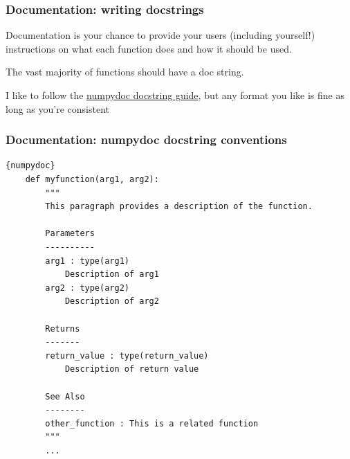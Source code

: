 \documentclass[10pt]{beamer}
\begin{document}
  \begin{frame} \frametitle{Documentation: writing docstrings}

    Documentation is your chance to provide your users (including yourself!) instructions
    on what each function does and how it should be used.

    \vspace{0.25cm}

    The vast majority of functions should have a doc string.

    \vspace{0.25cm}

    I like to follow the
    \href{https://numpydoc.readthedocs.io/en/latest/format.html}{numpydoc docstring guide},
    but any format you like is fine as long as you're consistent

  \end{frame}

  \begin{frame}[fragile] \frametitle{Documentation: numpydoc docstring conventions}

    \begin{lstlisting}{numpydoc}
    def myfunction(arg1, arg2):
        """
        This paragraph provides a description of the function.

        Parameters
        ----------
        arg1 : type(arg1)
            Description of arg1
        arg2 : type(arg2)
            Description of arg2

        Returns
        -------
        return_value : type(return_value)
            Description of return value

        See Also
        --------
        other_function : This is a related function
        """
        ...
    \end{lstlisting}

  \end{frame}
\end{document}

